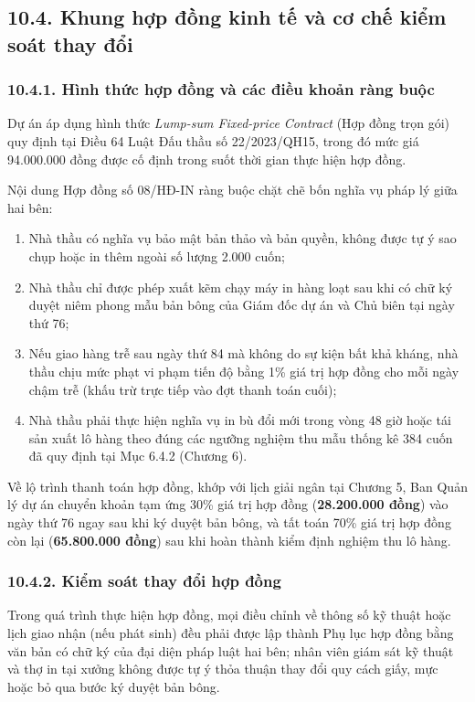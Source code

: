 \subsection{10.4. Khung hợp đồng kinh tế và cơ chế kiểm soát thay đổi}

\subsubsection{10.4.1. Hình thức hợp đồng và các điều khoản ràng buộc}

Dự án áp dụng hình thức \textit{Lump-sum Fixed-price Contract} (Hợp đồng trọn gói) quy định tại Điều 64 Luật Đấu thầu số 22/2023/QH15, trong đó mức giá 94.000.000 đồng được cố định trong suốt thời gian thực hiện hợp đồng.

Nội dung Hợp đồng số 08/HĐ-IN ràng buộc chặt chẽ bốn nghĩa vụ pháp lý giữa hai bên:
\begin{enumerate}
    \item Nhà thầu có nghĩa vụ bảo mật bản thảo và bản quyền, không được tự ý sao chụp hoặc in thêm ngoài số lượng 2.000 cuốn;
    \item Nhà thầu chỉ được phép xuất kẽm chạy máy in hàng loạt sau khi có chữ ký duyệt niêm phong mẫu bản bông của Giám đốc dự án và Chủ biên tại ngày thứ 76;
    \item Nếu giao hàng trễ sau ngày thứ 84 mà không do sự kiện bất khả kháng, nhà thầu chịu mức phạt vi phạm tiến độ bằng 1\% giá trị hợp đồng cho mỗi ngày chậm trễ (khấu trừ trực tiếp vào đợt thanh toán cuối);
    \item Nhà thầu phải thực hiện nghĩa vụ in bù đổi mới trong vòng 48 giờ hoặc tái sản xuất lô hàng theo đúng các ngưỡng nghiệm thu mẫu thống kê 384 cuốn đã quy định tại Mục 6.4.2 (Chương 6).
\end{enumerate}

Về lộ trình thanh toán hợp đồng, khớp với lịch giải ngân tại Chương 5, Ban Quản lý dự án chuyển khoản tạm ứng 30\% giá trị hợp đồng (\textbf{28.200.000 đồng}) vào ngày thứ 76 ngay sau khi ký duyệt bản bông, và tất toán 70\% giá trị hợp đồng còn lại (\textbf{65.800.000 đồng}) sau khi hoàn thành kiểm định nghiệm thu lô hàng.

\subsubsection{10.4.2. Kiểm soát thay đổi hợp đồng}

Trong quá trình thực hiện hợp đồng, mọi điều chỉnh về thông số kỹ thuật hoặc lịch giao nhận (nếu phát sinh) đều phải được lập thành Phụ lục hợp đồng bằng văn bản có chữ ký của đại diện pháp luật hai bên; nhân viên giám sát kỹ thuật và thợ in tại xưởng không được tự ý thỏa thuận thay đổi quy cách giấy, mực hoặc bỏ qua bước ký duyệt bản bông.

